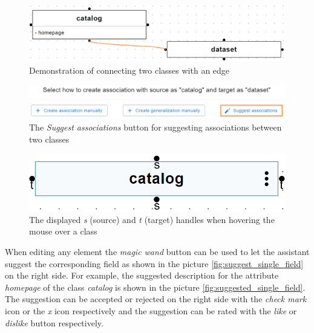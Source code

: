 \begin{figure}[!h]
    \includegraphics[scale=0.32]{../docs/images/frontend/edge-drag.png}
    \caption{\centering Demonstration of connecting two classes with an edge}
    \label{fig:edge_drag}
\end{figure}


\begin{figure}[!h]
    \includegraphics[scale=0.33]{../docs/images/frontend/suggest-associations-2.png}
    \caption{\centering The \textit{Suggest associations} button for suggesting associations between two classes}
    \label{fig:suggest_associations_2}
\end{figure}


\begin{figure}[!h]
    \includegraphics[scale=0.3]{../docs/images/frontend/handles.png}
    \caption{\centering The displayed \textit{s} (source) and \textit{t} (target) handles when hovering the mouse over a class}
    \label{fig:handles}
\end{figure}


When editing any element the \textit{magic wand} button can be used to let the assistant suggest the corresponding field as shown in the picture \ref{fig:suggest_single_field} on the right side. For example, the suggested description for the attribute \textit{homepage} of the class \textit{catalog} is shown in the picture \ref{fig:suggested_single_field}. The suggestion can be accepted or rejected on the right side with the \textit{check mark} icon or the \textit{x} icon respectively and the suggestion can be rated with the \textit{like} or \textit{dislike} button respectively.

